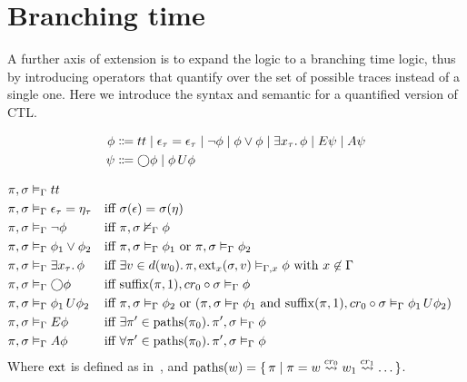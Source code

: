 \section{Branching time}
A further axis of extension is to expand the logic to a branching time logic, thus by introducing operators that
quantify over the set of possible traces instead of a single one. Here we introduce the syntax and semantic for a
quantified version of \ac{CTL}.

\begin{align*}
  \phi &\Coloneqq tt \;|\; \epsilon_\tau = \epsilon_\tau
                    \;|\; \neg\phi
                    \;|\; \phi \lor \phi
                    \;|\; \exists {x_\tau} \ldotp {\phi}
                    \;|\; E{\psi}
                    \;|\; A{\psi} \\
  \psi &\Coloneqq \bigcirc{\phi} \;|\; {\phi}\,U {\phi}
\end{align*}

\begin{align*}
  \pi, \sigma &\vDash_\Gamma tt \\
  \pi, \sigma &\vDash_\Gamma \epsilon_\tau = \eta_\tau &&\text{iff } \sigma(\epsilon) = \sigma(\eta) \\
  \pi, \sigma &\vDash_\Gamma \neg\phi &&\text{iff } {\pi}, {\sigma} \nvDash_{\Gamma} {\phi} \\
  \pi, \sigma &\vDash_\Gamma \phi_1 \lor \phi_2
      &&\text{iff } {\pi}, {\sigma} \vDash_{\Gamma} {\phi_1} \text{ or } {\pi}, {\sigma} \vDash_{\Gamma} {\phi_2} \\
  \pi, \sigma &\vDash_\Gamma \exists {x_\tau} \ldotp {\phi}
      &&\text{iff } \exists {v \in d(w_0)} \ldotp {{\pi}, {\operatorname{ext}_x(\sigma, v)} \vDash_{\Gamma, x} {\phi}}
        \text{ with } x \not\in \Gamma \\
  \pi, \sigma &\vDash_\Gamma \bigcirc{\phi}
      &&\text{iff } {\operatorname{suffix}(\pi, 1)}, {cr_0 \circ \sigma} \vDash_{\Gamma} {\phi} \\
  \pi, \sigma &\vDash_\Gamma {\phi_1}\,U {\phi_2}
      &&\text{iff } {\pi}, {\sigma} \vDash_{\Gamma} {\phi_2} \text{ or } ({\pi}, {\sigma} \vDash_{\Gamma} {\phi_1}
        \text { and } {\operatorname{suffix}(\pi, 1)}, {cr_0 \circ \sigma} \vDash_{\Gamma} {{\phi_1}\,U {\phi_2}}) \\
  \pi, \sigma &\vDash_\Gamma E{\phi}
      &&\text{iff } \exists {\pi' \in \operatorname{paths}(\pi_0)} \ldotp {{\pi'}, {\sigma} \vDash_{\Gamma} {\phi}} \\
  \pi, \sigma &\vDash_\Gamma A{\phi}
      &&\text{iff } \forall {\pi' \in \operatorname{paths}(\pi_0)} \ldotp {{\pi'}, {\sigma} \vDash_{\Gamma} {\phi}} \\
\end{align*}
Where $\operatorname{ext}$ is defined as in~, and $\operatorname{paths}(w) = \set{\pi | \pi = w \overset{cr_0}{\rightsquigarrow}
w_1 \overset{cr_1}{\rightsquigarrow} \ldots}$.

